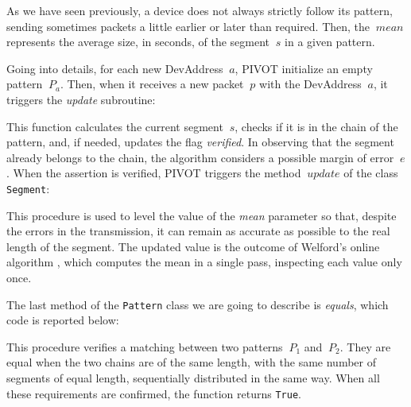 As we have seen previously, a device does not always strictly follow its pattern, sending sometimes packets a little earlier or later than required. Then, the \(\ mean \) represents the average size, in seconds, of the segment \(\ s \) in a given pattern.

\vspace{3mm}

Going into details, for each new DevAddress \(\ a \), PIVOT initialize an empty pattern \(\ P_{a} \). Then, when it receives a new packet \(\ p \) with the DevAddress \(\ a \), it triggers the \textit{update} subroutine:

\vspace{3mm}

\vspace{3mm}

This function calculates the current segment \(\ s \), checks if it is in the chain of the pattern, and, if needed, updates the flag \textit{verified}. In observing that the segment already belongs to the chain, the algorithm considers a possible margin of error \(\ e \). When the assertion is verified, PIVOT triggers the method \(\ update \) of the class \texttt{Segment}:

\vspace{3mm}

\vspace{3mm}

This procedure is used to level the value of the \textit{mean} parameter so that, despite the errors in the transmission, it can remain as accurate as possible to the real length of the segment. The updated value is the outcome of Welford's online algorithm \cite{welford}, which computes the mean in a single pass, inspecting each value only once.

\vspace{3mm}

The last method of the \texttt{Pattern} class we are going to describe is \textit{equals}, which code is reported below:

\vspace{3mm}

\vspace{3mm}

This procedure verifies a matching between two patterns \(\ P_{1} \) and \(\ P_{2} \). They are equal when the two chains are of the same length, with the same number of segments of equal length, sequentially distributed in the same way. When all these requirements are confirmed, the function returns \texttt{True}.

